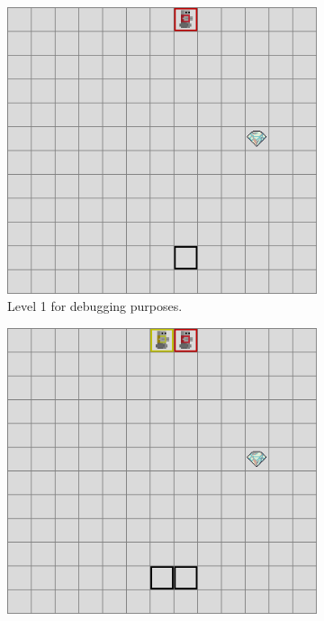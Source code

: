 \begin{figure}[h]
    \centering
    \begin{subfigure}[t]{0.31\linewidth}
        \includegraphics[width=\linewidth]{images/envs/lvl1.png}
        \caption{Level 1 for debugging purposes.\newline}
    \end{subfigure}
    \hfill
    \begin{subfigure}[t]{0.31\linewidth}
        \includegraphics[width=\linewidth]{images/envs/lvl2.png}

\end{subfigure}
\end{figure}
